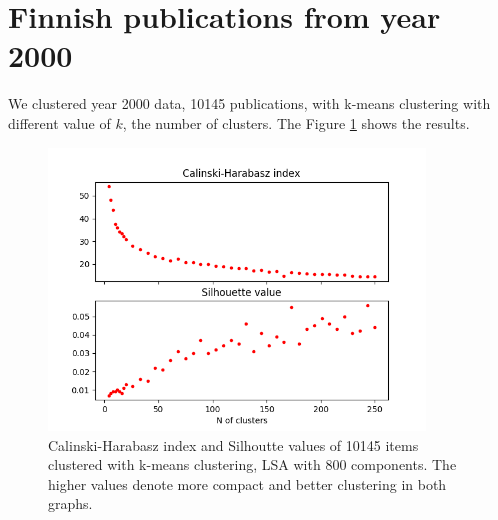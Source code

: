 % 

% 




\section{Finnish publications from year 2000}
We clustered year 2000 data, 10145 publications, with k-means 
clustering with different value of $k$, the number of clusters. 
The Figure \ref{fig:ch-silh-full-h} shows the results.
\begin{figure}[ht]
  \begin{center}    
\includegraphics[width=10cm]{images/c-h-silh-index-plot-y2000-2_260-800-kmeans.png}
    \caption{Calinski-Harabasz index and Silhoutte values of 
10145 items clustered with k-means clustering, LSA with 800 
components. The higher values denote more compact and better 
clustering in both graphs.}
    \label{fig:ch-silh-full-h}
  \end{center}
\end{figure}

